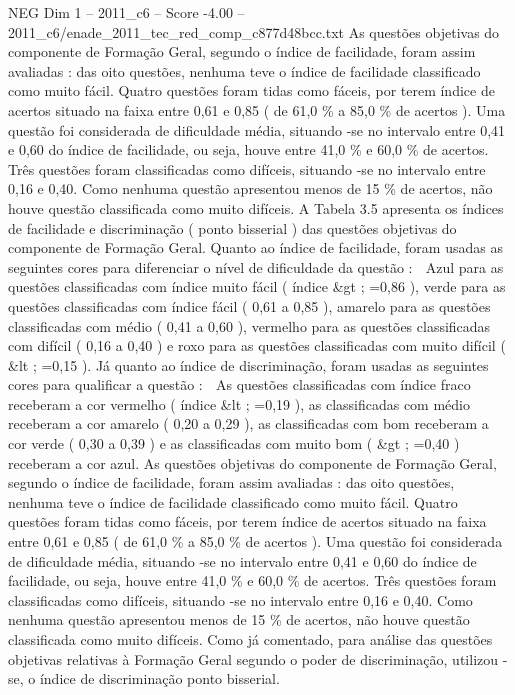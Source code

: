 \begin{textsample}{NEG Dim 1 – 2011\_c6 – Score -4.00 – 2011\_c6/enade\_2011\_tec\_red\_comp\_c877d48bcc.txt}
As questões objetivas do componente de Formação Geral, segundo o índice de facilidade, foram assim avaliadas : das oito questões, nenhuma teve o índice de facilidade classificado como muito fácil.
Quatro questões foram tidas como fáceis, por terem índice de acertos situado na faixa entre 0,61 e 0,85 ( de 61,0 \% a 85,0 \% de acertos ).
Uma questão foi considerada de dificuldade média, situando -se no intervalo entre 0,41 e 0,60 do índice de facilidade, ou seja, houve entre 41,0 \% e 60,0 \% de acertos.
Três questões foram classificadas como difíceis, situando -se no intervalo entre 0,16 e 0,40.
Como nenhuma questão apresentou menos de 15 \% de acertos, não houve questão classificada como muito difíceis.
A Tabela 3.5 apresenta os índices de facilidade e discriminação ( ponto bisserial ) das questões objetivas do componente de Formação Geral.
Quanto ao índice de facilidade, foram usadas as seguintes cores para diferenciar o nível de dificuldade da questão :  Azul para as questões classificadas com índice muito fácil ( índice \&gt ; =0,86 ), verde para as questões classificadas com índice fácil ( 0,61 a 0,85 ), amarelo para as questões classificadas com médio ( 0,41 a 0,60 ), vermelho para as questões classificadas com difícil ( 0,16 a 0,40 ) e roxo para as questões classificadas com muito difícil ( \&lt ; =0,15 ).
Já quanto ao índice de discriminação, foram usadas as seguintes cores para qualificar a questão :  As questões classificadas com índice fraco receberam a cor vermelho ( índice \&lt ; =0,19 ), as classificadas com médio receberam a cor amarelo ( 0,20 a 0,29 ), as classificadas com bom receberam a cor verde ( 0,30 a 0,39 ) e as classificadas com muito bom ( \&gt ; =0,40 ) receberam a cor azul.
As questões objetivas do componente de Formação Geral, segundo o índice de facilidade, foram assim avaliadas : das oito questões, nenhuma teve o índice de facilidade classificado como muito fácil.
Quatro questões foram tidas como fáceis, por terem índice de acertos situado na faixa entre 0,61 e 0,85 ( de 61,0 \% a 85,0 \% de acertos ).
Uma questão foi considerada de dificuldade média, situando -se no intervalo entre 0,41 e 0,60 do índice de facilidade, ou seja, houve entre 41,0 \% e 60,0 \% de acertos.
Três questões foram classificadas como difíceis, situando -se no intervalo entre 0,16 e 0,40.
Como nenhuma questão apresentou menos de 15 \% de acertos, não houve questão classificada como muito difíceis.
Como já comentado, para análise das questões objetivas relativas à Formação Geral segundo o poder de discriminação, utilizou -se, o índice de discriminação ponto bisserial.

\end{textsample}
